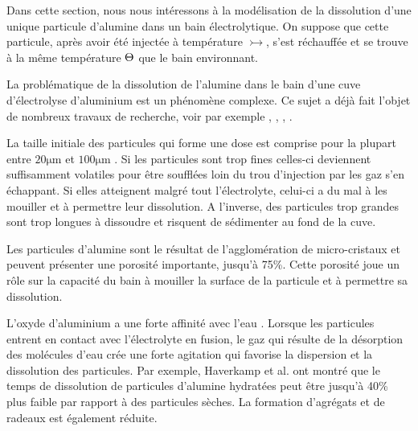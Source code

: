 Dans cette section, nous nous intéressons à la modélisation de la
dissolution d'une unique particule d'alumine dans un bain
électrolytique. On suppose que cette particule, après avoir été
injectée à température $\tinj$, s'est réchauffée et se trouve à la
même température $\Theta$ que le bain environnant.

La problématique de la dissolution de l'alumine dans le bain d'une
cuve d'électrolyse d'aluminium est un phénomène complexe. Ce sujet a
déjà fait l'objet de nombreux travaux de recherche, voir par exemple
\cite{Dassylva2015}, \cite{Kvande1986}, \cite{Gerlach1975},
\cite{Solheim1995}.

La taille initiale des particules qui forme une dose est comprise pour
la plupart entre $\num{20}\si{\micro\meter}$ et
$\num{100}\si{\micro\meter}$ \cite{Fini2017}. Si les particules sont
trop fines celles-ci deviennent suffisamment volatiles pour être
soufflées loin du trou d'injection par les gaz s'en échappant. Si
elles atteignent malgré tout l'électrolyte, celui-ci a du mal à les
mouiller et à permettre leur dissolution. A l'inverse, des particules
trop grandes sont trop longues à dissoudre et risquent de sédimenter
au fond de la cuve.

Les particules d'alumine sont le résultat de l'agglomération de
micro-cristaux et peuvent présenter une porosité importante, jusqu'à
\num{75}\%. Cette porosité joue un rôle sur la capacité du bain à
mouiller la surface de la particule et à permettre sa dissolution.

L'oxyde d'aluminium a une forte affinité avec l'eau
\cite{Patterson2001}. Lorsque les particules entrent en contact avec
l'électrolyte en fusion, le gaz qui résulte de la désorption des
molécules d'eau crée une forte agitation qui favorise la dispersion et
la dissolution des particules. Par exemple, Haverkamp et
al. \cite{Haverkamp1994} ont montré que le temps de dissolution de
particules d'alumine hydratées peut être jusqu'à \num{40}\% plus
faible par rapport à des particules sèches. La formation d'agrégats
et de radeaux est également réduite.

